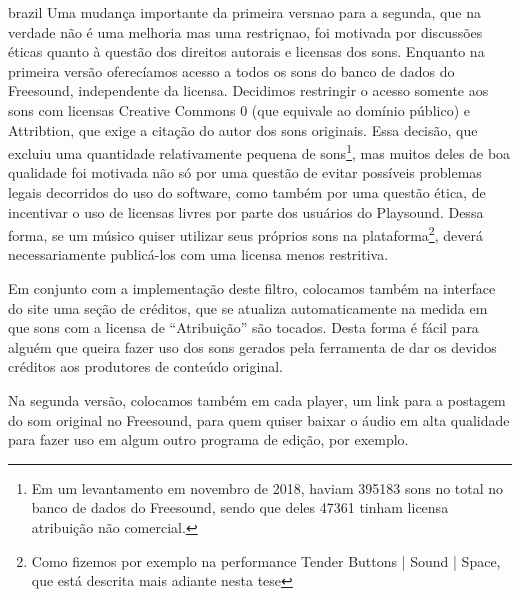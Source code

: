 \begin{otherlanguage*}{brazil}
Uma mudança importante da primeira versnao para a segunda, que na verdade não é uma melhoria mas uma restriçnao, foi motivada por discussões éticas quanto à questão dos direitos autorais e licensas dos sons. Enquanto na primeira versão oferecíamos acesso a todos os sons do banco de dados do Freesound, independente da licensa. Decidimos restringir o acesso somente aos sons com licensas Creative Commons 0 (que equivale ao domínio público) e Attribtion, que exige a citação do autor dos sons originais. Essa decisão, que excluiu uma quantidade relativamente pequena de sons\footnote{Em um levantamento em novembro de 2018, haviam 395183 sons no total no banco de dados do Freesound, sendo que deles 47361 tinham licensa atribuição não comercial.}, mas muitos deles de boa qualidade foi motivada não só por uma questão de evitar possíveis problemas legais decorridos do uso do software, como também por uma questão ética, de incentivar o uso de licensas livres por parte dos usuários do Playsound. Dessa forma, se um músico quiser utilizar seus próprios sons na plataforma\footnote{Como fizemos por exemplo na performance Tender Buttons | Sound | Space, que está descrita mais adiante nesta tese}, deverá necessariamente publicá-los com uma licensa menos restritiva. 

Em conjunto com a implementação deste filtro, colocamos também na interface do site uma seção de créditos, que se atualiza automaticamente na medida em que sons com a licensa de ``Atribuição'' são tocados. Desta forma é fácil para alguém que queira fazer uso dos sons gerados pela ferramenta de dar os devidos créditos aos produtores de conteúdo original. 

Na segunda versão, colocamos também em cada player, um link para a postagem do som original no Freesound, para quem quiser baixar o áudio em alta qualidade para fazer uso em algum outro programa de edição, por exemplo. 




\end{otherlanguage*}
